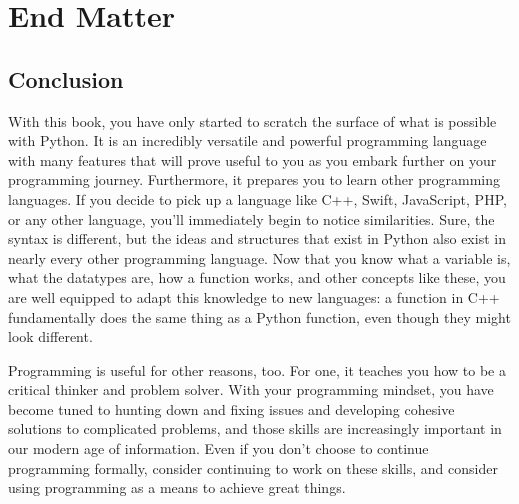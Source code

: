 \chapter*{End Matter}
\section*{Conclusion}
With this book, you have only started to scratch the surface of what is possible with Python. It is an incredibly versatile and powerful programming language with many features that will prove useful to you as you embark further on your programming journey. Furthermore, it prepares you to learn other programming languages. If you decide to pick up a language like C++, Swift, JavaScript, PHP, or any other language, you'll immediately begin to notice similarities. Sure, the syntax is different, but the ideas and structures that exist in Python also exist in nearly every other programming language. Now that you know what a variable is, what the datatypes are, how a function works, and other concepts like these, you are well equipped to adapt this knowledge to new languages: a function in C++ fundamentally does the same thing as a Python function, even though they might look different.\par
Programming is useful for other reasons, too. For one, it teaches you how to be a critical thinker and problem solver. With your programming mindset, you have become tuned to hunting down and fixing issues and developing cohesive solutions to complicated problems, and those skills are increasingly important in our modern age of information. Even if you don't choose to continue programming formally, consider continuing to work on these skills, and consider using programming as a means to achieve great things.
